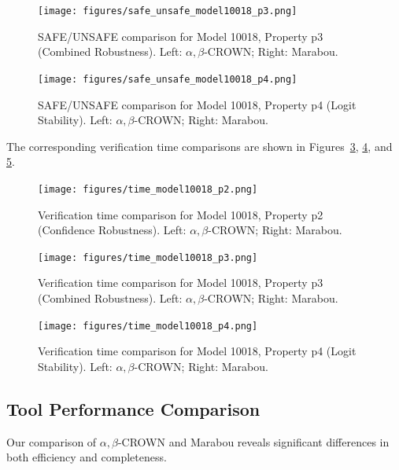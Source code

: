 \begin{figure}[htbp]
    \centering
    \texttt{[image: figures/safe\_unsafe\_model10018\_p3.png]}
    \caption{SAFE/UNSAFE comparison for Model 10018, Property p3 (Combined Robustness). Left: $\alpha, \beta$-CROWN; Right: Marabou.}
    \label{fig:safe_unsafe_model10018_p3}
\end{figure}

\begin{figure}[htbp]
    \centering
    \texttt{[image: figures/safe\_unsafe\_model10018\_p4.png]}
    \caption{SAFE/UNSAFE comparison for Model 10018, Property p4 (Logit Stability). Left: $\alpha, \beta$-CROWN; Right: Marabou.}
    \label{fig:safe_unsafe_model10018_p4}
\end{figure}

The corresponding verification time comparisons are shown in Figures~\ref{fig:time_model10018_p2}, \ref{fig:time_model10018_p3}, and \ref{fig:time_model10018_p4}.

\begin{figure}[htbp]
    \centering
    \texttt{[image: figures/time\_model10018\_p2.png]}
    \caption{Verification time comparison for Model 10018, Property p2 (Confidence Robustness). Left: $\alpha, \beta$-CROWN; Right: Marabou.}
    \label{fig:time_model10018_p2}
\end{figure}

\begin{figure}[htbp]
    \centering
    \texttt{[image: figures/time\_model10018\_p3.png]}
    \caption{Verification time comparison for Model 10018, Property p3 (Combined Robustness). Left: $\alpha, \beta$-CROWN; Right: Marabou.}
    \label{fig:time_model10018_p3}
\end{figure}

\begin{figure}[htbp]
    \centering
    \texttt{[image: figures/time\_model10018\_p4.png]}
    \caption{Verification time comparison for Model 10018, Property p4 (Logit Stability). Left: $\alpha, \beta$-CROWN; Right: Marabou.}
    \label{fig:time_model10018_p4}
\end{figure}

\subsection{Tool Performance Comparison}

Our comparison of $\alpha, \beta$-CROWN and Marabou reveals significant differences in both efficiency and completeness.

